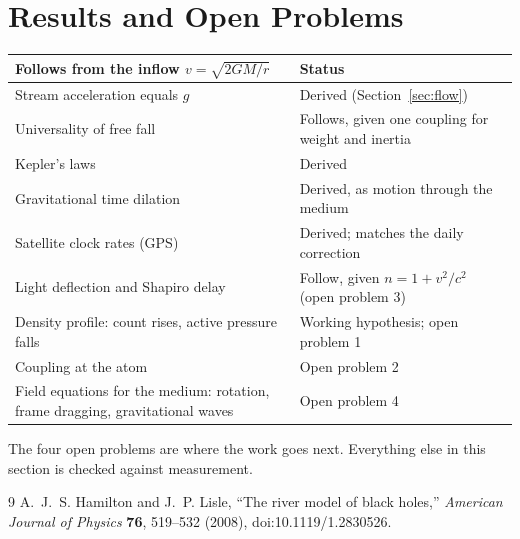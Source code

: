 \documentclass[11pt,a4paper]{article}
\begin{document}
\section{Results and Open Problems}
\begin{center}
\begin{tabular}{p{}p{}}
\toprule
\textbf{Follows from the inflow $v=\sqrt{2GM/r}$} & \textbf{Status} \\
\midrule
Stream acceleration equals $g$ & Derived (Section~\ref{sec:flow}) \\
Universality of free fall & Follows, given one coupling for weight and inertia \\
Kepler's laws & Derived \\
Gravitational time dilation & Derived, as motion through the medium \\
Satellite clock rates (GPS) & Derived; matches the daily correction \\
Light deflection and Shapiro delay & Follow, given $n = 1 + v^2/c^2$ (open problem 3) \\
Density profile: count rises, active pressure falls & Working hypothesis; open problem 1 \\
Coupling at the atom & Open problem 2 \\
Field equations for the medium: rotation, frame dragging, gravitational waves & Open problem 4 \\
\bottomrule
\end{tabular}
\end{center}

The four open problems are where the work goes next. Everything else in this section is checked against measurement.

\begin{thebibliography}{9}
 A.~J.~S. Hamilton and J.~P. Lisle, ``The river model of black holes,'' \emph{American Journal of Physics} \textbf{76}, 519--532 (2008), doi:10.1119/1.2830526.
\end{thebibliography}
\end{document}
